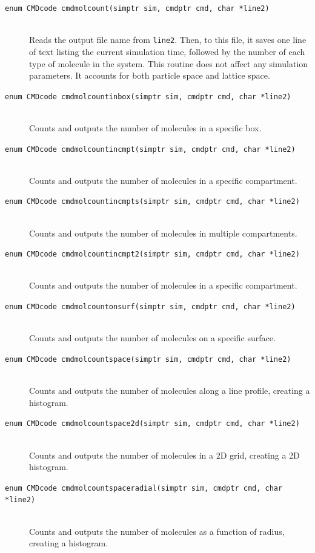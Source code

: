 \documentclass {scrbook}
\newcommand {\ttt} {\texttt}
\begin{document}
\begin{description}
\item[\ttt{enum CMDcode cmdmolcount(simptr sim, cmdptr cmd, char *line2)}]
\hfill \\
Reads the output file name from \ttt{line2}. Then, to this file, it saves one line of text listing the current simulation time, followed by the number of each type of molecule in the system. This routine does not affect any simulation parameters. It accounts for both particle space and lattice space.

\item[\ttt{enum CMDcode cmdmolcountinbox(simptr sim, cmdptr cmd, char *line2)}]
\hfill \\
Counts and outputs the number of molecules in a specific box.

\item[\ttt{enum CMDcode cmdmolcountincmpt(simptr sim, cmdptr cmd, char *line2)}]
\hfill \\
Counts and outputs the number of molecules in a specific compartment.

\item[\ttt{enum CMDcode cmdmolcountincmpts(simptr sim, cmdptr cmd, char *line2)}]
\hfill \\
Counts and outputs the number of molecules in multiple compartments.

\item[\ttt{enum CMDcode cmdmolcountincmpt2(simptr sim, cmdptr cmd, char *line2)}]
\hfill \\
Counts and outputs the number of molecules in a specific compartment.

\item[\ttt{enum CMDcode cmdmolcountonsurf(simptr sim, cmdptr cmd, char *line2)}]
\hfill \\
Counts and outputs the number of molecules on a specific surface.

\item[\ttt{enum CMDcode cmdmolcountspace(simptr sim, cmdptr cmd, char *line2)}]
\hfill \\
Counts and outputs the number of molecules along a line profile, creating a histogram.

\item[\ttt{enum CMDcode cmdmolcountspace2d(simptr sim, cmdptr cmd, char *line2)}]
\hfill \\
Counts and outputs the number of molecules in a 2D grid, creating a 2D histogram.

\item[\ttt{enum CMDcode cmdmolcountspaceradial(simptr sim, cmdptr cmd, char *line2)}]
\hfill \\
Counts and outputs the number of molecules as a function of radius, creating a histogram.


\end{description}
\end{document}
